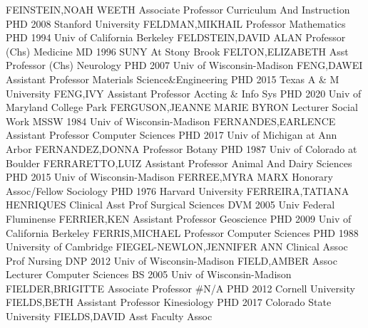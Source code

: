 \documentclass[
]{article}
\begin{document}
\textbar{}  \textbar FEINSTEIN,NOAH WEETH \textbar Associate
Professor \textbar Curriculum And Instruction \textbar PHD 2008 Stanford
University \textbar{}  \textbar FELDMAN,MIKHAIL
\textbar Professor \textbar Mathematics \textbar PHD 1994 Univ of
California Berkeley \textbar{}  \textbar FELDSTEIN,DAVID ALAN
\textbar Professor (Chs) \textbar Medicine \textbar MD 1996 SUNY At
Stony Brook \textbar{}  \textbar FELTON,ELIZABETH
\textbar Asst Professor (Chs) \textbar Neurology \textbar PHD 2007 Univ
of Wisconsin-Madison \textbar{}  \textbar FENG,DAWEI
\textbar Assistant Professor \textbar Materials Science\&Engineering
\textbar PHD 2015 Texas A \& M University \textbar{} 
\textbar FENG,IVY \textbar Assistant Professor \textbar Accting \& Info
Sys \textbar PHD 2020 Univ of Maryland College Park \textbar{}
 \textbar FERGUSON,JEANNE MARIE BYRON \textbar Lecturer
\textbar Social Work \textbar MSSW 1984 Univ of Wisconsin-Madison
\textbar{}  \textbar FERNANDES,EARLENCE \textbar Assistant
Professor \textbar Computer Sciences \textbar PHD 2017 Univ of Michigan
at Ann Arbor \textbar{}  \textbar FERNANDEZ,DONNA
\textbar Professor \textbar Botany \textbar PHD 1987 Univ of Colorado at
Boulder \textbar{}  \textbar FERRARETTO,LUIZ
\textbar Assistant Professor \textbar Animal And Dairy Sciences
\textbar PHD 2015 Univ of Wisconsin-Madison \textbar{} 
\textbar FERREE,MYRA MARX \textbar Honorary Assoc/Fellow
\textbar Sociology \textbar PHD 1976 Harvard University \textbar{}
 \textbar FERREIRA,TATIANA HENRIQUES \textbar Clinical Asst
Prof \textbar Surgical Sciences \textbar DVM 2005 Univ Federal
Fluminense \textbar{}  \textbar FERRIER,KEN
\textbar Assistant Professor \textbar Geoscience \textbar PHD 2009 Univ
of California Berkeley \textbar{}  \textbar FERRIS,MICHAEL
\textbar Professor \textbar Computer Sciences \textbar PHD 1988
University of Cambridge \textbar{} 
\textbar FIEGEL-NEWLON,JENNIFER ANN \textbar Clinical Assoc Prof
\textbar Nursing \textbar DNP 2012 Univ of Wisconsin-Madison \textbar{}
 \textbar FIELD,AMBER \textbar Assoc Lecturer
\textbar Computer Sciences \textbar BS 2005 Univ of Wisconsin-Madison
\textbar{}  \textbar FIELDER,BRIGITTE \textbar Associate
Professor \textbar\#N/A \textbar PHD 2012 Cornell University \textbar{}
 \textbar FIELDS,BETH \textbar Assistant Professor
\textbar Kinesiology \textbar PHD 2017 Colorado State University
\textbar{}  \textbar FIELDS,DAVID \textbar Asst Faculty Assoc
\end{document}
